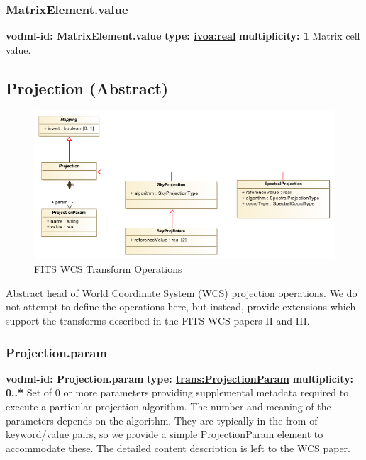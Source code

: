     \subsubsection{MatrixElement.value}
      \textbf{vodml-id: MatrixElement.value} \newline
      \textbf{type: \hyperref[sect:ivoa]{ivoa:real}} \newline
      \textbf{multiplicity: 1} \newline 
      Matrix cell value.

  \subsection{Projection (Abstract)}
  \label{sect:Projection}

    \begin{figure}[h]
    \begin{center}
      \includegraphics[width=5.25in]{diagrams/fitswcs_operations.png}
      \caption{FITS WCS Transform Operations}\label{fig:WCSOps}
    \end{center}
    \end{figure}

    Abstract head of World Coordinate System (WCS) projection operations. We do not attempt to define the operations here, but instead, provide extensions which support the transforms described in the FITS WCS papers II and III.

    \subsubsection{Projection.param}
      \textbf{vodml-id: Projection.param} \newline
      \textbf{type: \hyperref[sect:ProjectionParam]{trans:ProjectionParam}} \newline
      \textbf{multiplicity: 0..*} \newline 
      Set of 0 or more parameters providing supplemental metadata required to execute a particular projection algorithm. The number and meaning of the parameters depends on the algorithm. They are typically in the from of keyword/value pairs, so we provide a simple ProjectionParam element to accommodate these. The detailed content description is left to the WCS paper.


